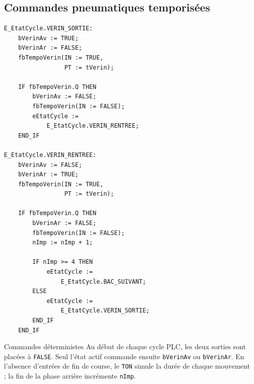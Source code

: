 \begin{minipage}[t]{0.605\textwidth}\vspace{0pt}
  \subsection{Commandes pneumatiques temporisées}
\begin{lstlisting}[style=stcode]
E_EtatCycle.VERIN_SORTIE:
    bVerinAv := TRUE;
    bVerinAr := FALSE;
    fbTempoVerin(IN := TRUE,
                 PT := tVerin);

    IF fbTempoVerin.Q THEN
        bVerinAv := FALSE;
        fbTempoVerin(IN := FALSE);
        eEtatCycle :=
            E_EtatCycle.VERIN_RENTREE;
    END_IF

E_EtatCycle.VERIN_RENTREE:
    bVerinAv := FALSE;
    bVerinAr := TRUE;
    fbTempoVerin(IN := TRUE,
                 PT := tVerin);

    IF fbTempoVerin.Q THEN
        bVerinAr := FALSE;
        fbTempoVerin(IN := FALSE);
        nImp := nImp + 1;

        IF nImp >= 4 THEN
            eEtatCycle :=
                E_EtatCycle.BAC_SUIVANT;
        ELSE
            eEtatCycle :=
                E_EtatCycle.VERIN_SORTIE;
        END_IF
    END_IF
\end{lstlisting}

  \begin{notebox}{Commandes déterministes}
    Au début de chaque cycle PLC, les deux sorties sont placées à \texttt{FALSE}. Seul l'état actif commande ensuite \texttt{bVerinAv} ou \texttt{bVerinAr}. En l'absence d'entrées de fin de course, le \texttt{TON} simule la durée de chaque mouvement ; la fin de la phase arrière incrémente \texttt{nImp}.
  \end{notebox}
\end{minipage}

\newpage

